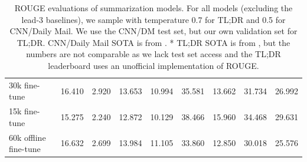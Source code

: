 \begin{table}[t]
\begin{tabular}{l|cccc|cccc}
30k fine-tune
& 16.410 & 2.920 & 13.653 & 10.994
& 35.581 & 13.662 & 31.734 & 26.992
\\

15k fine-tune
& 15.275 & 2.240 & 12.872 & 10.129
& 38.466 & 15.960 & 34.468 & 29.631
\\


60k offline fine-tune
& 16.632 & 2.699 & 13.984 & 11.105
& 33.860 & 12.850 & 30.018 & 25.576
\\





\bottomrule
\end{tabular}
\caption{ROUGE evaluations of summarization models.  For all models (excluding the lead-3 baselines), we sample with temperature 0.7 for TL;DR and 0.5 for CNN/Daily Mail.  We use the CNN/DM test set, but our own validation set for TL;DR. CNN/Daily Mail SOTA is from \citet{gehrmann2018bottom}.  * TL;DR SOTA is from \citet{gehrmann2019generating}, but the numbers are not comparable as we lack test set access and the TL;DR leaderboard uses an unofficial implementation of ROUGE.
\label{tab:rouge}}
\end{table}
